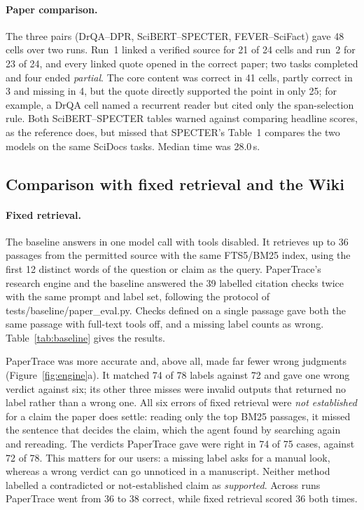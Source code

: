 \documentclass{article}
\newcommand{\code}[1]{{\ttfamily\small\hyphenchar\font=-1\relax #1}}
\begin{document}
\paragraph{Paper comparison.} The three pairs (DrQA--DPR, SciBERT--SPECTER, FEVER--SciFact) gave 48
cells over two runs. Run~1 linked a verified source for 21 of 24 cells and run~2 for 23 of 24, and
every linked quote opened in the correct paper; two tasks completed and four ended \emph{partial}.
The core content was correct in 41 cells, partly correct in 3 and missing in 4, but the quote
directly supported the point in only 25; for example, a DrQA cell named a recurrent reader but cited
only the span-selection rule. Both SciBERT--SPECTER tables warned against comparing headline scores,
as the reference does, but missed that SPECTER's Table~1 compares the two models on the same
SciDocs tasks. Median time was 28.0\,s.

\subsection{Comparison with fixed retrieval and the Wiki}
\label{sec:eval-baselines}

\paragraph{Fixed retrieval.} The baseline answers in one model call with tools disabled. It retrieves
up to 36 passages from the permitted source with the same FTS5/BM25 index, using the first 12
distinct words of the question or claim as the query. PaperTrace's research engine and the
baseline answered the 39 labelled citation checks twice with the same prompt and label set, following
the protocol of \code{tests/baseline/paper\_eval.py}. Checks defined on a single passage gave both the
same passage with full-text tools off, and a missing label counts as wrong. Table~\ref{tab:baseline}
gives the results.

PaperTrace was more accurate and, above all, made far fewer wrong judgments
(Figure~\ref{fig:engine}a). It matched 74 of 78 labels against 72 and gave one wrong verdict against
six; its other three misses were invalid outputs that returned no label rather than a wrong one.
All six errors of fixed retrieval were \emph{not established} for a claim the paper does settle:
reading only the top BM25 passages, it missed the sentence that decides the claim, which the agent
found by searching again and rereading. The verdicts PaperTrace gave were right in 74 of 75 cases,
against 72 of 78. This matters for our users: a missing label asks for a manual look, whereas a wrong
verdict can go unnoticed in a manuscript. Neither method labelled a contradicted or not-established
claim as \emph{supported}. Across runs PaperTrace went from 36 to 38 correct, while fixed retrieval
scored 36 both times.
\end{document}
